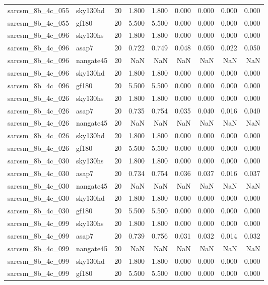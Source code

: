 \begin{tabular}{llrrrrrrr}
sarcsm\_8b\_4c\_055 & sky130hd & 20 & 1.800 & 1.800 & 0.000 & 0.000 & 0.000 & 0.000 \\
sarcsm\_8b\_4c\_055 & gf180 & 20 & 5.500 & 5.500 & 0.000 & 0.000 & 0.000 & 0.000 \\
sarcsm\_8b\_4c\_096 & sky130hs & 20 & 1.800 & 1.800 & 0.000 & 0.000 & 0.000 & 0.000 \\
sarcsm\_8b\_4c\_096 & asap7 & 20 & 0.722 & 0.749 & 0.048 & 0.050 & 0.022 & 0.050 \\
sarcsm\_8b\_4c\_096 & nangate45 & 20 & NaN & NaN & NaN & NaN & NaN & NaN \\
sarcsm\_8b\_4c\_096 & sky130hd & 20 & 1.800 & 1.800 & 0.000 & 0.000 & 0.000 & 0.000 \\
sarcsm\_8b\_4c\_096 & gf180 & 20 & 5.500 & 5.500 & 0.000 & 0.000 & 0.000 & 0.000 \\
sarcsm\_8b\_4c\_026 & sky130hs & 20 & 1.800 & 1.800 & 0.000 & 0.000 & 0.000 & 0.000 \\
sarcsm\_8b\_4c\_026 & asap7 & 20 & 0.735 & 0.754 & 0.035 & 0.040 & 0.016 & 0.040 \\
sarcsm\_8b\_4c\_026 & nangate45 & 20 & NaN & NaN & NaN & NaN & NaN & NaN \\
sarcsm\_8b\_4c\_026 & sky130hd & 20 & 1.800 & 1.800 & 0.000 & 0.000 & 0.000 & 0.000 \\
sarcsm\_8b\_4c\_026 & gf180 & 20 & 5.500 & 5.500 & 0.000 & 0.000 & 0.000 & 0.000 \\
sarcsm\_8b\_4c\_030 & sky130hs & 20 & 1.800 & 1.800 & 0.000 & 0.000 & 0.000 & 0.000 \\
sarcsm\_8b\_4c\_030 & asap7 & 20 & 0.734 & 0.754 & 0.036 & 0.037 & 0.016 & 0.037 \\
sarcsm\_8b\_4c\_030 & nangate45 & 20 & NaN & NaN & NaN & NaN & NaN & NaN \\
sarcsm\_8b\_4c\_030 & sky130hd & 20 & 1.800 & 1.800 & 0.000 & 0.000 & 0.000 & 0.000 \\
sarcsm\_8b\_4c\_030 & gf180 & 20 & 5.500 & 5.500 & 0.000 & 0.000 & 0.000 & 0.000 \\
sarcsm\_8b\_4c\_099 & sky130hs & 20 & 1.800 & 1.800 & 0.000 & 0.000 & 0.000 & 0.000 \\
sarcsm\_8b\_4c\_099 & asap7 & 20 & 0.739 & 0.756 & 0.031 & 0.032 & 0.014 & 0.032 \\
sarcsm\_8b\_4c\_099 & nangate45 & 20 & NaN & NaN & NaN & NaN & NaN & NaN \\
sarcsm\_8b\_4c\_099 & sky130hd & 20 & 1.800 & 1.800 & 0.000 & 0.000 & 0.000 & 0.000 \\
sarcsm\_8b\_4c\_099 & gf180 & 20 & 5.500 & 5.500 & 0.000 & 0.000 & 0.000 & 0.000 \\

\end{tabular}
